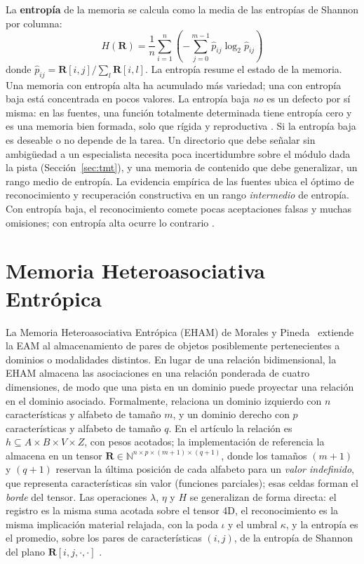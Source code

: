 La \textbf{entropía} de la memoria se calcula como la media de las entropías de Shannon
por columna:
\begin{equation}
    H(\mathbf{R}) = \frac{1}{n} \sum_{i=1}^{n} \left(-\sum_{j=0}^{m-1} \hat{p}_{ij} \log_2 \hat{p}_{ij}\right)
    \label{eq:entropia}
\end{equation}
donde $\hat{p}_{ij} = \mathbf{R}[i,j] / \sum_l \mathbf{R}[i,l]$.
La entropía resume el estado de la memoria.
Una memoria con entropía alta ha acumulado más variedad; una con entropía baja está
concentrada en pocos valores.
La entropía baja \emph{no} es un defecto por sí misma: en las
fuentes, una función totalmente determinada tiene entropía cero y es una
memoria bien formada, solo que rígida y reproductiva
\cite{pineda2021entropic,morales2022manuscript}.
Si la entropía baja es deseable o no depende de la tarea.
Un directorio que debe señalar sin ambigüedad a un especialista necesita poca
incertidumbre sobre el módulo dada la pista (Sección~\ref{sec:tmt}), y una memoria de
contenido que debe generalizar, un rango medio de entropía.
La evidencia empírica de las fuentes ubica el óptimo de reconocimiento y recuperación
constructiva en un rango \emph{intermedio} de entropía.
Con entropía baja, el reconocimiento comete pocas aceptaciones falsas y muchas
omisiones; con entropía alta ocurre lo contrario \cite{pineda2023imagery}.

\section{Memoria Heteroasociativa Entrópica}
\label{sec:hetero4d}

La Memoria Heteroasociativa Entrópica (EHAM) de Morales y
Pineda~\cite{morales2025missing}
extiende la EAM al almacenamiento de pares de objetos posiblemente pertenecientes a
dominios o modalidades distintos.
En lugar de una relación bidimensional, la EHAM almacena las asociaciones en una relación
ponderada de cuatro dimensiones, de modo que una pista en un dominio puede proyectar una
relación en el dominio asociado.
Formalmente, relaciona un dominio izquierdo con $n$ características y alfabeto de tamaño $m$,
y un dominio derecho con $p$ características y alfabeto de tamaño $q$.
En el artículo la relación es $h \subseteq A \times B \times V \times Z$, con pesos
acotados; la implementación de referencia la almacena en un tensor
$\mathbf{R} \in \mathbb{N}^{n \times p \times (m+1) \times (q+1)}$,
donde los tamaños $(m+1)$ y $(q+1)$ reservan la última posición de cada alfabeto para
un \emph{valor indefinido}, que representa características sin valor (funciones
parciales); esas celdas forman el \emph{borde} del tensor.
Las operaciones $\lambda$, $\eta$ y $H$ se generalizan de forma directa: el registro es
la misma suma acotada sobre el tensor 4D, el reconocimiento es la misma implicación
material relajada, con la poda $\iota$ y el umbral $\kappa$, y la entropía es el
promedio, sobre los pares de características $(i, j)$, de la entropía de Shannon del plano
$\mathbf{R}[i, j, \cdot, \cdot]$ \cite{morales2025missing}.

